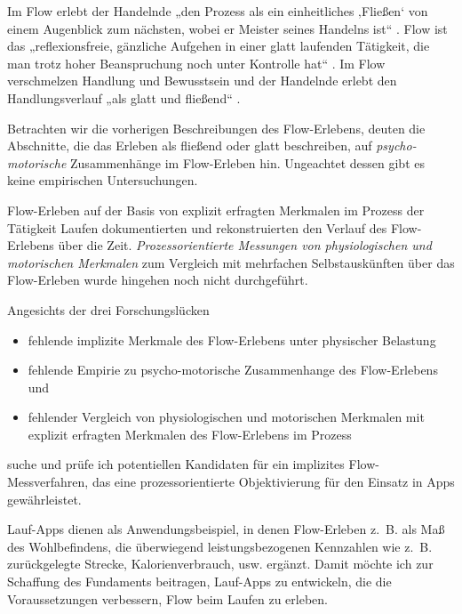 Im Flow erlebt der Handelnde „den Prozess als ein einheitliches ‚Fließen‘ von einem Augenblick zum nächsten, wobei er Meister seines Handelns ist“ \citep[][S.~59]{Csikszentmihalyi2010}. Flow ist das „reflexionsfreie, gänzliche Aufgehen in einer glatt laufenden Tätigkeit, die man trotz hoher Beanspruchung noch unter Kontrolle hat“ \citep[][S.~156]{Rheinberg2003}. Im Flow verschmelzen Handlung und Bewusstsein und der Handelnde erlebt den Handlungsverlauf „als glatt und fließend“ \citep[][S.~13]{Henk2014}.

Betrachten wir die vorherigen Beschreibungen des Flow-Erlebens, deuten die Abschnitte, die das Erleben als fließend oder glatt beschreiben, auf \emph{psycho-motorische} Zusammenhänge im Flow-Erleben hin. Ungeachtet dessen gibt es keine empirischen Untersuchungen.

Flow-Erleben auf der Basis von explizit erfragten Merkmalen im Prozess der Tätigkeit Laufen dokumentierten \citet{Reinhardt2006, Schuler2009} und rekonstruierten den Verlauf des Flow-Erlebens über die Zeit. \emph{Prozessorientierte Messungen von physiologischen und motorischen Merkmalen} zum Vergleich mit mehrfachen Selbstauskünften über das Flow-Erleben wurde hingehen noch nicht durchgeführt.

Angesichts der drei Forschungslücken
\begin{itemize}

	\item fehlende implizite Merkmale des Flow-Erlebens unter physischer Belastung

	\item fehlende Empirie zu psycho-motorische Zusammenhange des Flow-Erlebens und

	\item fehlender Vergleich von physiologischen und motorischen Merkmalen mit explizit erfragten Merkmalen des Flow-Erlebens im Prozess

\end{itemize}
suche und prüfe ich potentiellen Kandidaten für ein implizites Flow-Messverfahren, das eine prozessorientierte Objektivierung für den Einsatz in Apps gewährleistet. 

Lauf-Apps dienen als Anwendungsbeispiel, in denen Flow-Erleben z.~B. als Maß des Wohlbefindens, die überwiegend leistungsbezogenen Kennzahlen wie z.~B. zurückgelegte Strecke, Kalorienverbrauch, usw. ergänzt. Damit möchte ich zur Schaffung des Fundaments beitragen, Lauf-Apps zu entwickeln, die die Voraussetzungen verbessern, Flow beim Laufen zu erleben. 


